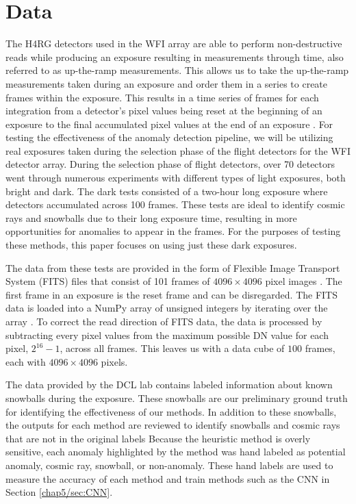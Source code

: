 \section{Data}
\label{chap5/sec:data}
The H4RG detectors used in the WFI array are able to perform non-destructive reads while producing an exposure resulting in measurements through time, also referred to as up-the-ramp measurements. 
This allows us to take the up-the-ramp measurements taken during an exposure and order them in a series to create frames within the exposure. 
This results in a time series of frames for each integration from a detector's pixel values being reset at the beginning of an exposure to the final accumulated pixel values at the end of an exposure \cite{jwstjdoc} \cite{casertano2022determining}.
For testing the effectiveness of the anomaly detection pipeline, we will be utilizing real exposures taken during the selection phase of the flight detectors for the WFI detector array. 
During the selection phase of flight detectors, over 70 detectors went through numerous experiments with different types of light exposures, both bright and dark.
The dark tests consisted of a two-hour long exposure where detectors accumulated across 100 frames.
These tests are ideal to identify cosmic rays and snowballs due to their long exposure time, resulting in more opportunities for anomalies to appear in the frames. 
For the purposes of testing these methods, this paper focuses on using just these dark exposures. 

The data from these tests are provided in the form of Flexible Image Transport System (FITS) files that consist of 101 frames of $4096 \times 4096$ pixel images \cite{wells1979fits}.
The first frame in an exposure is the reset frame and can be disregarded. 
The FITS data is loaded into a NumPy array of unsigned integers by iterating over the array \cite{harris2020array}.
To correct the read direction of FITS data, the data is processed by subtracting every pixel values from the maximum possible DN value for each pixel, $2^{16} - 1$, across all frames.
This leaves us with a data cube of $100$ frames, each with $4096 \times 4096$ pixels. 

The data provided by the DCL lab contains labeled information about known snowballs during the exposure. 
These snowballs are our preliminary ground truth for identifying the effectiveness of our methods. 
In addition to these snowballs, the outputs for each method are reviewed to identify snowballs and cosmic rays that are not in the original labels
Because the heuristic method is overly sensitive, each anomaly highlighted by the method was hand labeled as potential anomaly, cosmic ray, snowball, or non-anomaly. 
These hand labels are used to measure the accuracy of each method and train methods such as the CNN in Section \ref{chap5/sec:CNN}.

